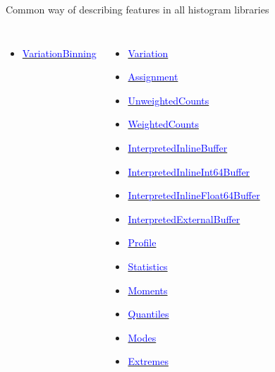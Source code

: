 \documentclass[aspectratio=169]{beamer}
\begin{document}
\begin{frame}{Common way of describing features in all histogram libraries}
\begin{columns}[t]
\begin{itemize}
  \item \href{https://github.com/scikit-hep/aghast/blob/master/specification.adoc\#variationbinning}{\textcolor{blue}{VariationBinning}}
\end{itemize}
\begin{itemize}
  \item \href{https://github.com/scikit-hep/aghast/blob/master/specification.adoc\#variation}{\textcolor{blue}{Variation}}
  \item \href{https://github.com/scikit-hep/aghast/blob/master/specification.adoc\#assignment}{\textcolor{blue}{Assignment}}
  \item \href{https://github.com/scikit-hep/aghast/blob/master/specification.adoc\#unweightedcounts}{\textcolor{blue}{UnweightedCounts}}
  \item \href{https://github.com/scikit-hep/aghast/blob/master/specification.adoc\#weightedcounts}{\textcolor{blue}{WeightedCounts}}
  \item \href{https://github.com/scikit-hep/aghast/blob/master/specification.adoc\#interpretedinlinebuffer}{\textcolor{blue}{InterpretedInlineBuffer}}
  \item \href{https://github.com/scikit-hep/aghast/blob/master/specification.adoc\#interpretedinlineint64buffer}{\textcolor{blue}{InterpretedInlineInt64Buffer}}
  \item \href{https://github.com/scikit-hep/aghast/blob/master/specification.adoc\#interpretedinlinefloat64buffer}{\textcolor{blue}{InterpretedInlineFloat64Buffer}}
  \item \href{https://github.com/scikit-hep/aghast/blob/master/specification.adoc\#interpretedexternalbuffer}{\textcolor{blue}{InterpretedExternalBuffer}}
  \item \href{https://github.com/scikit-hep/aghast/blob/master/specification.adoc\#profile}{\textcolor{blue}{Profile}}
  \item \href{https://github.com/scikit-hep/aghast/blob/master/specification.adoc\#statistics}{\textcolor{blue}{Statistics}}
  \item \href{https://github.com/scikit-hep/aghast/blob/master/specification.adoc\#moments}{\textcolor{blue}{Moments}}
  \item \href{https://github.com/scikit-hep/aghast/blob/master/specification.adoc\#quantiles}{\textcolor{blue}{Quantiles}}
  \item \href{https://github.com/scikit-hep/aghast/blob/master/specification.adoc\#modes}{\textcolor{blue}{Modes}}
  \item \href{https://github.com/scikit-hep/aghast/blob/master/specification.adoc\#extremes}{\textcolor{blue}{Extremes}}

\end{itemize}
\end{columns}
\end{frame}
\end{document}
